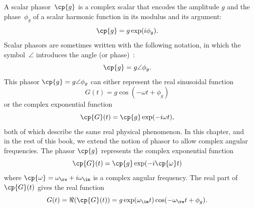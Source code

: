 \begin{refsection}
A scalar phasor~$\cp{g}$ is a complex scalar that encodes the amplitude $g$ and the phase~$\phi_g$ of a scalar harmonic function in its modulus and its argument:
\begin{equation}
    \cp{g} = g \exp(i \phi_g)
    \text{.}
\end{equation}
Scalar phasors are sometimes written with the following notation, in which the symbol~$\angle$ introduces the angle (or phase)~\parencite{nilsson2007electric}:
\begin{equation}
    \cp{g} = g \angle \phi_g
    \text{.}
\end{equation}
This phasor $\cp{g} = g \angle \phi_g$
can either represent the real sinusoidal function
\begin{equation}
    G(t) = g \cos(-\omega t + \phi_g)
\end{equation}
or the complex exponential function
\begin{equation}
    \cp{G}(t) = \cp{g} \exp(-i \omega t)
    \text{,}
\end{equation}
both of which describe the same real physical phenomenon.
In this chapter, and in the rest of this book, we extend the notion of phasor to allow complex angular frequencies.
The phasor $\cp{g}$ represents the complex exponential function
\begin{equation}
    \cp{G}(t) = \cp{g} \exp(-i \cp{\omega} t)
\end{equation}
where $\cp{\omega} = \omega_\re + i \omega_\im$ is a complex angular frequency.
The real part of $\cp{G}(t)$ gives the real function
\begin{equation}
    G(t) = \Re(\cp{G}(t)) = g \exp(\omega_\im t) \cos(- \omega_\re t + \phi_g)
    \text{.}
\end{equation}


\end{refsection}
